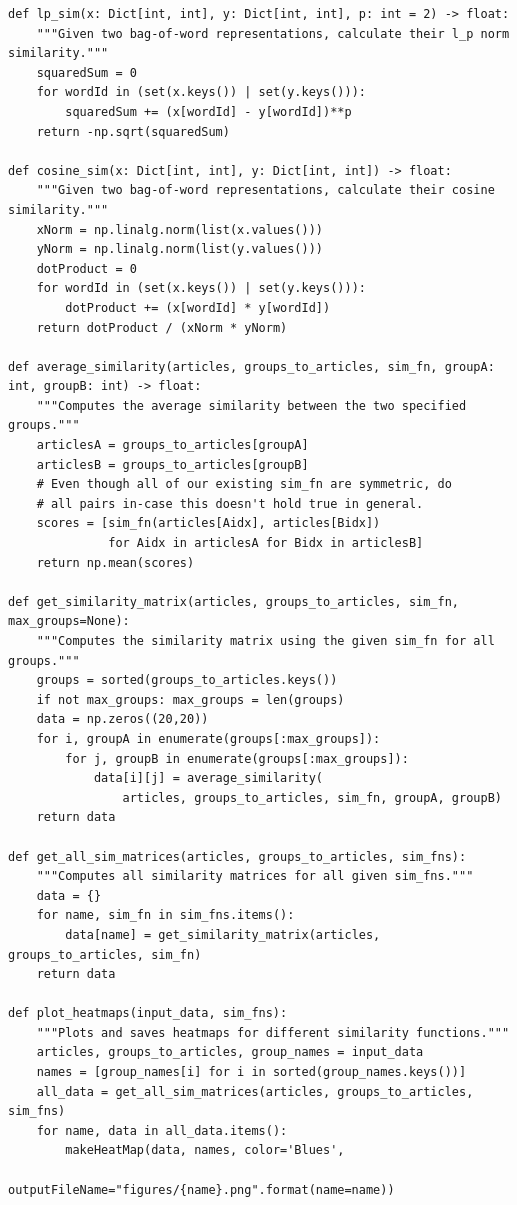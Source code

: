 \documentclass[12pt]{article}
\begin{document}
\begin{enumerate}[label=(\alph*)]
\begin{verbatim}
def lp_sim(x: Dict[int, int], y: Dict[int, int], p: int = 2) -> float:
    """Given two bag-of-word representations, calculate their l_p norm similarity."""
    squaredSum = 0
    for wordId in (set(x.keys()) | set(y.keys())):
        squaredSum += (x[wordId] - y[wordId])**p
    return -np.sqrt(squaredSum)

def cosine_sim(x: Dict[int, int], y: Dict[int, int]) -> float:
    """Given two bag-of-word representations, calculate their cosine similarity."""
    xNorm = np.linalg.norm(list(x.values()))
    yNorm = np.linalg.norm(list(y.values()))
    dotProduct = 0
    for wordId in (set(x.keys()) | set(y.keys())):
        dotProduct += (x[wordId] * y[wordId])
    return dotProduct / (xNorm * yNorm)

def average_similarity(articles, groups_to_articles, sim_fn, groupA: int, groupB: int) -> float:
    """Computes the average similarity between the two specified groups."""
    articlesA = groups_to_articles[groupA]
    articlesB = groups_to_articles[groupB]
    # Even though all of our existing sim_fn are symmetric, do
    # all pairs in-case this doesn't hold true in general.
    scores = [sim_fn(articles[Aidx], articles[Bidx])
              for Aidx in articlesA for Bidx in articlesB]
    return np.mean(scores)

def get_similarity_matrix(articles, groups_to_articles, sim_fn, max_groups=None):
    """Computes the similarity matrix using the given sim_fn for all groups."""
    groups = sorted(groups_to_articles.keys())
    if not max_groups: max_groups = len(groups)
    data = np.zeros((20,20))
    for i, groupA in enumerate(groups[:max_groups]):
        for j, groupB in enumerate(groups[:max_groups]):
            data[i][j] = average_similarity(
                articles, groups_to_articles, sim_fn, groupA, groupB)
    return data

def get_all_sim_matrices(articles, groups_to_articles, sim_fns):
    """Computes all similarity matrices for all given sim_fns."""
    data = {}
    for name, sim_fn in sim_fns.items():
        data[name] = get_similarity_matrix(articles, groups_to_articles, sim_fn)
    return data

def plot_heatmaps(input_data, sim_fns):
    """Plots and saves heatmaps for different similarity functions."""
    articles, groups_to_articles, group_names = input_data
    names = [group_names[i] for i in sorted(group_names.keys())]
    all_data = get_all_sim_matrices(articles, groups_to_articles, sim_fns)
    for name, data in all_data.items():
        makeHeatMap(data, names, color='Blues',
                    outputFileName="figures/{name}.png".format(name=name))


\end{verbatim}
\end{enumerate}
\end{document}
